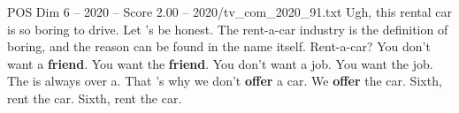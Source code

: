 \begin{textsample}{POS Dim 6 – 2020 – Score 2.00 – 2020/tv\_com\_2020\_91.txt}  \label{ex:f6_pos_042}
Ugh, this rental car is so boring to drive.
Let 's be honest.
The rent-a-car industry is the definition of boring, and the reason can be found in the name itself.
Rent-a-car?
You don't want a \textbf{friend}.
You want the \textbf{friend}.
You don't want a job.
You want the job.
The is always over a.
That 's why we don't \textbf{offer} a car.
We \textbf{offer} the car.
Sixth, rent the car.
Sixth, rent the car.

\end{textsample}
